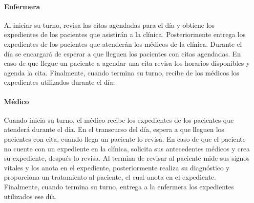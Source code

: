 	\paragraph{Enfermera}
	Al iniciar su turno, revisa las citas agendadas para el día y obtiene los expedientes de los pacientes que asistirán a la clínica. Posteriormente entrega los expedientes de los pacientes que atenderán los médicos de la clínica. Durante el día se encargará de esperar a que lleguen los pacientes con citas agendadas. En caso de que llegue un paciente a agendar una cita revisa los horarios disponibles y agenda la cita. Finalmente, cuando termina su turno, recibe de los médicos los expedientes utilizados durante el día.
	\paragraph{Médico}
	Cuando inicia su turno, el médico recibe los expedientes de los pacientes que atenderá durante el día. En el transcurso del día, espera a que lleguen los pacientes con cita, cuando llega un paciente lo revisa. En caso de que el paciente no cuente con un expediente en la clínica, solicita sus antecedentes médicos y crea su expediente, después lo revisa. Al termina de revisar al paciente mide sus signos vitales y los anota en el expediente, posteriormente realiza su diagnóstico y proporciona un tratamiento al paciente, el cual anota en el expediente. Finalmente, cuando termina su turno, entrega a la enfermera los expedientes utilizados ese día.
